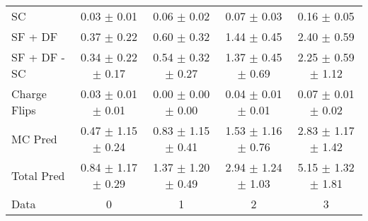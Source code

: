 \begin{tabular}{l|cccc}
                                 SC &  0.03 $\pm$  0.01 &  0.06 $\pm$  0.02 &  0.07 $\pm$  0.03 &  0.16 $\pm$  0.05 \\
                            SF + DF &  0.37 $\pm$  0.22 &  0.60 $\pm$  0.32 &  1.44 $\pm$  0.45 &  2.40 $\pm$  0.59 \\
\hline
                       SF + DF - SC &  0.34 $\pm$  0.22 $\pm$  0.17 &  0.54 $\pm$  0.32 $\pm$  0.27 &  1.37 $\pm$  0.45 $\pm$  0.69 &  2.25 $\pm$  0.59 $\pm$  1.12 \\
\hline\hline
                       Charge Flips &  0.03 $\pm$  0.01 $\pm$  0.01 &  0.00 $\pm$  0.00 $\pm$  0.00 &  0.04 $\pm$  0.01 $\pm$  0.01 &  0.07 $\pm$  0.01 $\pm$  0.02 \\
\hline
                            MC Pred &  0.47 $\pm$  1.15 $\pm$  0.24 &  0.83 $\pm$  1.15 $\pm$  0.41 &  1.53 $\pm$  1.16 $\pm$  0.76 &  2.83 $\pm$  1.17 $\pm$  1.42 \\
\hline
                         Total Pred &  0.84 $\pm$  1.17 $\pm$  0.29 &  1.37 $\pm$  1.20 $\pm$  0.49 &  2.94 $\pm$  1.24 $\pm$  1.03 &  5.15 $\pm$  1.32 $\pm$  1.81 \\
\hline\hline
                               Data &     0 &     1 &     2 &     3 \\
\hline\hline
\end{tabular}

